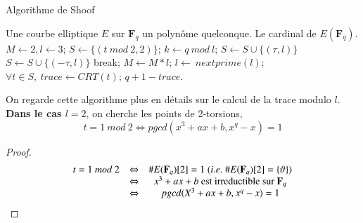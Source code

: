 \documentclass{article}%
\theoremstyle{plain}
\theoremstyle{definition}
\theoremstyle{plain}
\theoremstyle{plain}
\theoremstyle{remark}
\newcommand\fq{\mathbf{F}_{q}}
\begin{document}
\begin{algorithm}[H]
\caption{Algorithme de Shoof}
\label{schoof1}
\begin{algorithmic} 
\REQUIRE Une courbe elliptique $E$ sur $\fq$ un polynôme quelconque.
\ENSURE Le cardinal de $E(\fq)$.
\STATE $M\leftarrow 2, l\leftarrow 3$;
\STATE $S\leftarrow \{(t\ mod\ 2, 2)\}$; 
    \STATE $k\leftarrow q\ mod\ l$;	
            \STATE $S\leftarrow S\cup \{(\tau, l)\}$ \OR $S\leftarrow S\cup \{(-\tau, l)\}$ 
            \STATE break;
        \ENDIF
    \ENDFOR
    \STATE $M\leftarrow M*l$;
    \STATE $l\leftarrow\ nextprime(l)$; 	
\ENDWHILE
\STATE $\forall t\in S,\ trace\leftarrow CRT(t)$; 
\RETURN $q + 1 - trace$.
\end{algorithmic}
\end{algorithm}


On regarde cette algorithme plus en détails sur le calcul de la trace modulo $l$.\\

\textbf{Dans le cas $l = 2$}, on cherche les points de 2-torsions, 
\begin{equation}
t=1\ mod\ 2\Leftrightarrow pgcd(x^{3} + ax + b, x^{q} - x) = 1
\label{cas2}
\end{equation}
\begin{proof}
$$
\begin{array}{cl cl}
t=1\ mod\ 2 &\Leftrightarrow& \#E(\fq)[2] = 1\ (i.e.\ \#E(\fq)[2]=\{\vartheta\})\\
&\Leftrightarrow& x^{3} + ax + b\text{ est irreductible sur }\fq\\
&\Leftrightarrow& pgcd(X^{3} + ax + b, x^{q} - x) = 1
\end{array}
$$
\end{proof}
\end{document}
